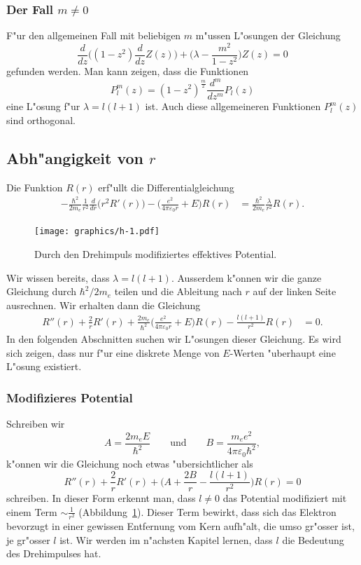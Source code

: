 \subsubsection{Der Fall $m\ne 0$}
F"ur den allgemeinen Fall mit beliebigen $m$ m"ussen L"osungen der
Gleichung
\begin{equation}
\frac{d}{dz}\biggl((1-z^2)\frac{d}{dz}Z(z)\biggr)
+\biggl(\lambda -\frac{m^2}{1-z^2}\biggr)Z(z)=0
\end{equation}
gefunden werden. Man kann zeigen, dass die Funktionen
\[
P_l^m(z)=
(1-z^2)^{\frac{m}2}\frac{d^m}{dz^m}P_l(z)
\]
eine L"osung f"ur $\lambda=l(l+1)$ ist.
Auch diese allgemeineren Funktionen $P_l^m(z)$ sind orthogonal.

\subsection{Abh"angigkeit von $r$}
Die Funktion $R(r)$ erf"ullt die Differentialgleichung
\begin{align}
-\frac{\hbar^2}{2m_e} \frac{1}{r^2}\frac{d}{dr}\bigl(r^2R'(r)\bigr)
-
\biggl(\frac{e^2}{4\pi\varepsilon_0r} + E \biggr) R(r)
&=
\frac{\hbar^2}{2m_e}\frac{\lambda}{r^2}
R(r).
\label{skript:radialgleichung}
\end{align}
\begin{figure}
\centering
\texttt{[image: graphics/h-1.pdf]}
\caption{Durch den Drehimpuls modifiziertes effektives Potential.
\label{skript:modifiziertes-potential}}
\end{figure}%
Wir wissen bereits, dass $\lambda=l(l+1)$.
Ausserdem k"onnen wir die ganze Gleichung durch $\hbar^2/2m_e$ teilen
und die Ableitung nach $r$ auf der linken Seite ausrechnen. 
Wir erhalten dann die Gleichung
\begin{align*}
R''(r)+\frac{2}{r}R'(r)
+\frac{2m_e}{\hbar^2}
\biggl(\frac{e^2}{4\pi\varepsilon_0r} + E \biggr) R(r)
-\frac{l(l+1)}{r^2}
R(r)
&=0.
\end{align*}
In den folgenden Abschnitten suchen wir L"osungen dieser Gleichung.
Es wird sich zeigen, dass nur f"ur eine diskrete Menge von $E$-Werten
"uberhaupt eine L"osung existiert.
\subsubsection{Modifizieres Potential}
Schreiben wir
\begin{equation}
A=\frac{2m_eE}{\hbar^2}
\qquad\text{und}\qquad
B=\frac{m_ee^2}{4\pi\varepsilon_0\hbar^2},
\label{skript:AundB}
\end{equation}
k"onnen wir die Gleichung noch etwas "ubersichtlicher als
\begin{equation}
R''(r)+\frac2{r}R'(r)+\biggl(A+\frac{2B}r-\frac{l(l+1)}{r^2}\biggr)R(r)=0
\label{skript:hreduziert}
\end{equation}
schreiben.
In dieser Form erkennt man, dass $l\ne 0$
das Potential modifiziert mit einem Term
$\sim\frac1{r^2}$ (Abbildung~\ref{skript:modifiziertes-potential}).
Dieser Term bewirkt, dass sich das Elektron bevorzugt in einer
gewissen Entfernung vom Kern aufh"alt, die umso gr"osser ist, je
gr"osser $l$ ist.
Wir werden im n"achsten Kapitel lernen, dass $l$ die Bedeutung des
Drehimpulses hat.

